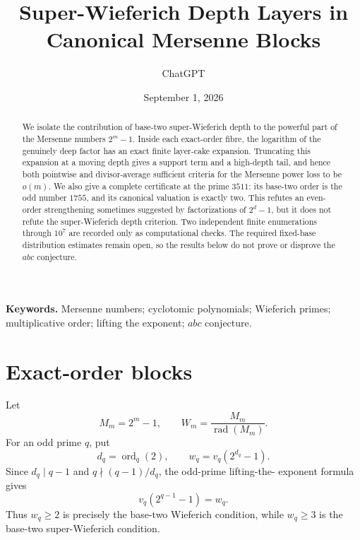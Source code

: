 \documentclass[11pt]{article}
\title{Super-Wieferich Depth Layers in Canonical Mersenne Blocks}
\author{ChatGPT}
\date{September 1, 2026}
\theoremstyle{remark}
\DeclareMathOperator{\ord}{ord}
\DeclareMathOperator{\rad}{rad}
\begin{document}
\maketitle

\begin{abstract}
We isolate the contribution of base-two super-Wieferich depth to the
powerful part of the Mersenne numbers $2^m-1$.  Inside each exact-order
fibre, the logarithm of the genuinely deep factor has an exact finite
layer-cake expansion.  Truncating this expansion at a moving depth gives a
support term and a high-depth tail, and hence both pointwise and
divisor-average sufficient criteria for the Mersenne power loss to be
$o(m)$.  We also give a complete certificate at the prime $3511$: its
base-two order is the odd number $1755$, and its canonical valuation is
exactly two.  This refutes an even-order strengthening sometimes suggested
by factorizations of $2^d-1$, but it does not refute the super-Wieferich
depth criterion.  Two independent finite enumerations through $10^7$ are
recorded only as computational checks.  The required fixed-base
distribution estimates remain open, so the results below do not prove or
disprove the $abc$ conjecture.
\end{abstract}

\noindent\textbf{Keywords.}
Mersenne numbers; cyclotomic polynomials; Wieferich primes;
multiplicative order; lifting the exponent; $abc$ conjecture.

\section{Exact-order blocks}
\label{sec:blocks}

Let
\[
  M_m=2^m-1,
  \qquad
  W_m=\frac{M_m}{\rad(M_m)}.
\]
For an odd prime $q$, put
\begin{equation}
  d_q=\ord_q(2),
  \qquad
  w_q=v_q(2^{d_q}-1).
  \label{eq:canonical-data}
\end{equation}
Since $d_q\mid q-1$ and $q\nmid(q-1)/d_q$, the odd-prime lifting-the-
exponent formula gives
\begin{equation}
  v_q(2^{q-1}-1)=w_q.
  \label{eq:fermat-depth}
\end{equation}
Thus $w_q\ge2$ is precisely the base-two Wieferich condition, while
$w_q\ge3$ is the base-two super-Wieferich condition.
\end{document}
